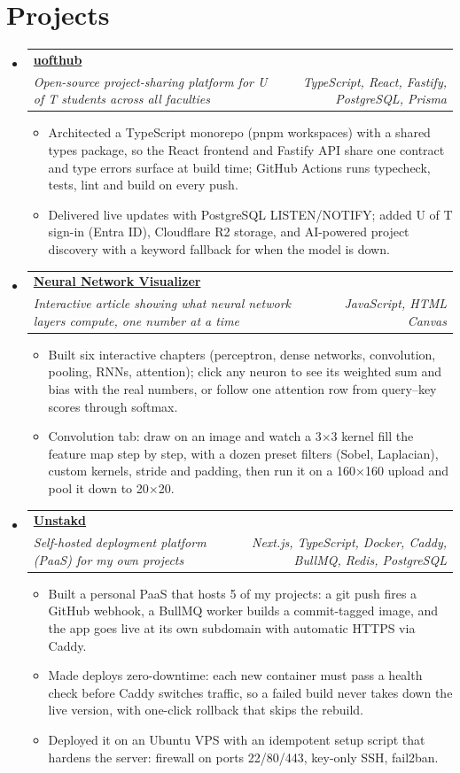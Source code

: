 \documentclass[letterpaper,10pt]{article}
\makeatletter
\newcommand{\resumeItem}[1]{
\item\normalsize{#1 \vspace{-3pt}}
}
\newcommand{\resumeSubheading}[4]{
\vspace{-3pt}\item
\begin{tabular*}{\textwidth}[t]{l@{\extracolsep{\fill}}r}
\textbf{#1} & #2 \\
\textit{\small #3} & \textit{\small #4} \\
\end{tabular*}\vspace{-8pt}
}
\newcommand{\resumeItemListStart}{
\begin{itemize}[leftmargin=0.15in, itemsep=0pt, topsep=2pt, label=\textbullet]
}
\newcommand{\resumeItemListEnd}{
\end{itemize}\vspace{2pt}
}
\newcommand{\resumeSubHeadingListStart}{
\begin{itemize}[leftmargin=0in, label={}, itemsep=0pt]
}
\newcommand{\resumeSubHeadingListEnd}{
\end{itemize}\vspace{-8pt}
}
\makeatother
\begin{document}
\section{Projects}
\resumeSubHeadingListStart
\resumeSubheading
{\href{https://uofthub.com}{uofthub}}
{}
{Open-source project-sharing platform for U of T students across all faculties}
{TypeScript, React, Fastify, PostgreSQL, Prisma}
\resumeItemListStart
\resumeItem{Architected a TypeScript monorepo (pnpm workspaces) with a shared types package, so the React frontend and Fastify API
share one contract and type errors surface at build time; GitHub Actions runs typecheck, tests, lint and build on every push.}
\resumeItem{Delivered live updates with PostgreSQL LISTEN/NOTIFY; added U of T sign-in (Entra ID), Cloudflare R2 storage,
and AI-powered project discovery with a keyword fallback for when the model is down.}
\resumeItemListEnd
\resumeSubheading
{\href{https://ml.renfred.dev}{Neural Network Visualizer}}
{}
{Interactive article showing what neural network layers compute, one number at a time}
{JavaScript, HTML Canvas}
\resumeItemListStart
\resumeItem{Built six interactive chapters (perceptron, dense networks, convolution, pooling, RNNs, attention); click any neuron to see
its weighted sum and bias with the real numbers, or follow one attention row from query--key scores through softmax.}
\resumeItem{Convolution tab: draw on an image and watch a 3$\times$3 kernel fill the feature map step by step, with a dozen preset filters
(Sobel, Laplacian), custom kernels, stride and padding, then run it on a 160$\times$160 upload and pool it down to 20$\times$20.}
\resumeItemListEnd
\resumeSubheading
{\href{https://unstakd.com}{Unstakd}}
{}
{Self-hosted deployment platform (PaaS) for my own projects}
{Next.js, TypeScript, Docker, Caddy, BullMQ, Redis, PostgreSQL}
\resumeItemListStart
\resumeItem{Built a personal PaaS that hosts 5 of my projects: a git push fires a GitHub webhook, a BullMQ worker builds a
commit-tagged image, and the app goes live at its own subdomain with automatic HTTPS via Caddy.}
\resumeItem{Made deploys zero-downtime: each new container must pass a health check before Caddy switches traffic, so a failed build never takes
down the live version, with one-click rollback that skips the rebuild.}
\resumeItem{Deployed it on an Ubuntu VPS with an idempotent setup script that hardens the server: firewall on ports 22/80/443, key-only SSH, fail2ban.}
\resumeItemListEnd

\resumeSubHeadingListEnd

\end{document}
